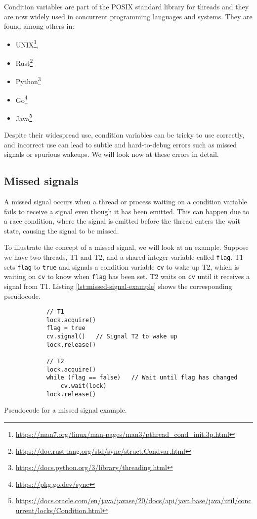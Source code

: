 Condition variables are part of the POSIX standard library for threads \cite{nichols1996pthreads}
and they are now widely used in concurrent programming languages and systems.
They are found among others in:

\begin{itemize}
      \item UNIX\footnote{\url{https://man7.org/linux/man-pages/man3/pthread_cond_init.3p.html}},
      \item Rust\footnote{\url{https://doc.rust-lang.org/std/sync/struct.Condvar.html}}
      \item Python\footnote{\url{https://docs.python.org/3/library/threading.html}}
      \item Go\footnote{\url{https://pkg.go.dev/sync}}
      \item Java\footnote{
                  \url{https://docs.oracle.com/en/java/javase/20/docs/api/java.base/java/util/concurrent/locks/Condition.html}}
\end{itemize}

Despite their widespread use, condition variables can be tricky to use correctly,
and incorrect use can lead to subtle and
hard-to-debug errors such as missed signals or spurious wakeups.
We will look now at these errors in detail.

\subsection{Missed signals}

A missed signal occurs when a thread or process waiting on a condition variable
fails to receive a signal even though it has been emitted.
This can happen due to a race condition, where the signal is emitted
before the thread enters the wait state, causing the signal to be missed.

To illustrate the concept of a missed signal, we will look at an example.
Suppose we have two threads, T1 and T2,
and a shared integer variable called \texttt{flag}.
T1 sets \texttt{flag} to \texttt{true} and signals
a condition variable \texttt{cv} to wake up T2,
which is waiting on \texttt{cv} to know when \texttt{flag} has been set.
T2 waits on \texttt{cv} until it receives a signal from T1.
Listing \ref{lst:missed-signal-example} shows the corresponding pseudocode.

\begin{listing}
      \begin{verbatim}
            // T1
            lock.acquire()
            flag = true
            cv.signal()   // Signal T2 to wake up
            lock.release()
            
            // T2
            lock.acquire()
            while (flag == false)   // Wait until flag has changed
                cv.wait(lock)
            lock.release()
      \end{verbatim}
      \caption{Pseudocode for a missed signal example.}
      \label{lst:missed-signal-example}
\end{listing}

